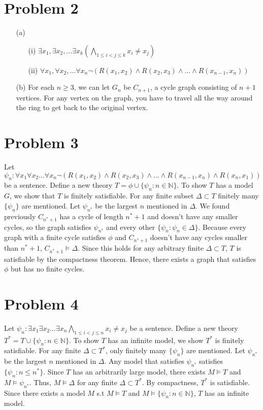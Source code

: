 \documentclass[10pt]{article}
\begin{document}
\section*{Problem 2}
\begin{itemize}
    \item [(a)]\begin{itemize}
        \item [(i)] $\exists x_1,\exists x_2,\ldots\exists x_k (\underset{1\le i<j\le k}{\bigwedge}x_i\neq x_j)$
        \item [(ii)] $\forall x_1,\forall x_2,\ldots\forall x_n\lnot(R(x_1,x_2)\land R(x_2,x_3)\land\ldots\land R(x_{n-1},x_n))$
    \end{itemize}
    \item [(b)] For each $n\ge 3$, we can let $G_n$ be $C_{n+1}$, a cycle graph consisting of $n+1$ vertices. 
    For any vertex on the graph, you have to travel all the way around the ring to get back to the original vertex.
\end{itemize}
\section*{Problem 3}
Let $\psi_n:\forall x_1\forall x_2\ldots\forall x_n \lnot(R(x_1,x_2)\land R(x_2,x_3)\land\ldots\land R(x_{n-1},x_n)\land R(x_n,x_1))$ be a sentence. Define a new theory $T=\phi\cup\{\psi_n :n\in\mathbb{N}\}$. 
To show $T$ has a model $G$, we show that $T$ is finitely satisfiable. 
For any finite subset $\Delta\subset T$ finitely many  $\{\psi_n \}$ are mentioned. 
Let $\psi_{n^*}$ be the largest $n$ mentioned in $\Delta$.
We found previously $C_{n^*+1}$ has a cycle of length $n^*+1$ and doesn't have any smaller cycles, so the graph satisfies $\psi_{n^*}$ and every other $\{\psi_{n}: \psi_{n}\in\Delta\}$. 
Because every graph with a finite cycle satisfies $\phi$ and $C_{n^*+1}$ doesn't have any cycles smaller than $n^*+1$, $C_{n^*+1}\models\Delta$.
Since this holds for any arbitrary finite $\Delta\subset T$, $T$ is satisfiable by the compactness theorem.
Hence, there exists a graph that satisfies $\phi$ but has no finite cycles.
\section*{Problem 4}
Let $\psi_n:\exists x_1\exists x_2\ldots\exists x_n \underset{1\le i<j\le n}{\bigwedge}x_i\neq x_j$ be a sentence. 
Define a new theory $T^*=T\cup\{\psi_n:n\in \mathbb{N}\}$. 
To show $T$ has an infinite model, we show $T^*$ is finitely satisfiable.
For any finite $\Delta\subset T^*$, only finitely many $\{\psi_n \}$ are mentioned.
Let $\psi_{n^*}$ be the largest $n$ mentioned in $\Delta$.
Any model that satisfies $\psi_{n^*}$ satisfies $\{\psi_{n}:n\le n^* \}$.
Since $T$ has an arbitrarily large model, there exists $M\models T$ and $M\models \psi_{n^*}$.
Thus, $M\models\Delta$ for any finite $\Delta\subset T^*$.
By compactness, $T^*$ is satisfiable.
Since there exists a model $M$ s.t $M\models T$ and $M\models\{\psi_n:n\in \mathbb{N}\}$, $T$ has an infinite model.
\end{document}

